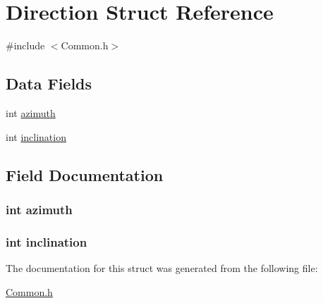 \hypertarget{struct_direction}{\section{Direction Struct Reference}
\label{struct_direction}
}


{\ttfamily \#include $<$Common.\+h$>$}

\subsection*{Data Fields}
\begin{DoxyCompactItemize}
\item 
int \hyperlink{struct_direction_a866e78e12cb32dcaf1ded89bda8be8f5}{azimuth}
\item 
int \hyperlink{struct_direction_af308b9934394c8bcf7614eb1df2d863f}{inclination}
\end{DoxyCompactItemize}


\subsection{Field Documentation}
\hypertarget{struct_direction_a866e78e12cb32dcaf1ded89bda8be8f5}{
\subsubsection[{azimuth}]{\setlength{\rightskip}{0pt plus 5cm}int azimuth}}\label{struct_direction_a866e78e12cb32dcaf1ded89bda8be8f5}
\hypertarget{struct_direction_af308b9934394c8bcf7614eb1df2d863f}{
\subsubsection[{inclination}]{\setlength{\rightskip}{0pt plus 5cm}int inclination}}\label{struct_direction_af308b9934394c8bcf7614eb1df2d863f}


The documentation for this struct was generated from the following file\+:\begin{DoxyCompactItemize}
\item 
\hyperlink{_common_8h}{Common.\+h}\end{DoxyCompactItemize}
